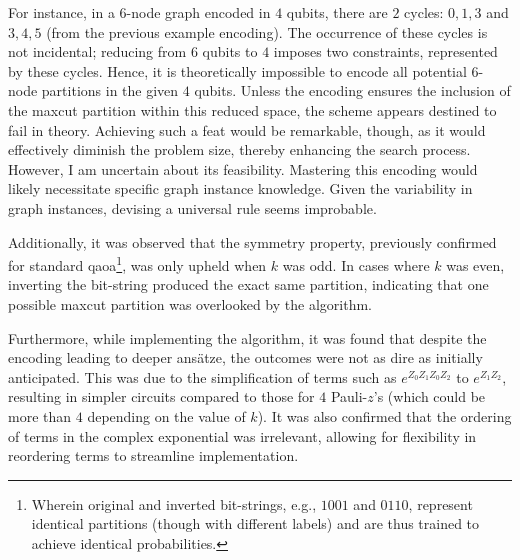 For instance, in a $6$-node graph encoded in $4$ qubits, there are $2$ cycles: $0, 1, 3$ and $3, 4, 5$ (from the previous example encoding). The occurrence of these cycles is not incidental; reducing from $6$ qubits to $4$ imposes two constraints, represented by these cycles. Hence, it is theoretically impossible to encode all potential $6$-node partitions in the given $4$ qubits. Unless the encoding ensures the inclusion of the \acrshort{maxcut} partition within this reduced space, the scheme appears destined to fail in theory. Achieving such a feat would be remarkable, though, as it would effectively diminish the problem size, thereby enhancing the search process. However, I am uncertain about its feasibility. Mastering this encoding would likely necessitate specific graph instance knowledge. Given the variability in graph instances, devising a universal rule seems improbable.

Additionally, it was observed that the symmetry property, previously confirmed for standard \acrshort{qaoa}\footnote{Wherein original and inverted bit-strings, e.g., $1001$ and $0110$, represent identical partitions (though with different labels) and are thus trained to achieve identical probabilities.}, was only upheld when $k$ was odd. In cases where $k$ was even, inverting the bit-string produced the exact same partition, indicating that one possible \acrshort{maxcut} partition was overlooked by the algorithm.

Furthermore, while implementing the algorithm, it was found that despite the encoding leading to deeper ansätze, the outcomes were not as dire as initially anticipated. This was due to the simplification of terms such as $e^{Z_0Z_1Z_0Z_2}$ to $e^{Z_1Z_2}$, resulting in simpler circuits compared to those for $4$ Pauli-$z$'s (which could be more than $4$ depending on the value of $k$). It was also confirmed that the ordering of terms in the complex exponential was irrelevant, allowing for flexibility in reordering terms to streamline implementation.

